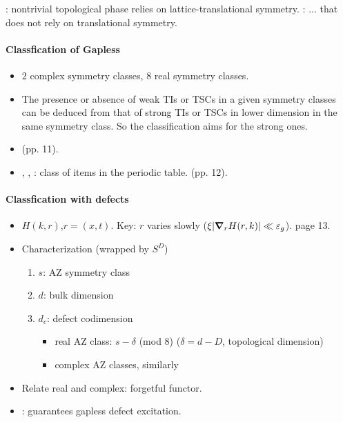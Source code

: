 \documentclass{article}
\begin{document}
: nontrivial topological phase relies
on lattice-translational symmetry.
: ... that does not rely on
translational symmetry.

\paragraph{Classfication of Gapless}
\begin{itemize}
    \item $2$ complex symmetry classes, $8$ real symmetry classes.
    \item The presence or absence of weak TIs or TSCs in a given
        symmetry classes can be deduced from that of strong TIs or
        TSCs in lower dimension in the same symmetry class. So the
        classification aims for the strong ones.
    \item {} (pp. 11).
    \item {}, ,
        :
        class of items in the periodic table. (pp. 12).
\end{itemize}

\paragraph{Classfication with defects}
\begin{itemize}
    \item {} $H(k,r)$,$r=(x,t)$. Key: $r$
        varies slowly ($\xi|\grad_r H(r,k)|\ll \varepsilon_g$). page
        13.
    \item Characterization (wrapped by $S^D$)
        \begin{enumerate}
            \item $s$: AZ symmetry class
            \item $d$: bulk dimension
            \item $d_c$: defect codimension
            \begin{itemize}
                \item real AZ class: $s-\delta$ (mod $8$)
                    ($\delta=d-D$, topological dimension)
                \item complex AZ classes, similarly
            \end{itemize}
        \end{enumerate}
    \item Relate real and complex: forgetful functor.
    \item {}: guarantees gapless
        defect excitation.
\end{itemize}
\end{document}

